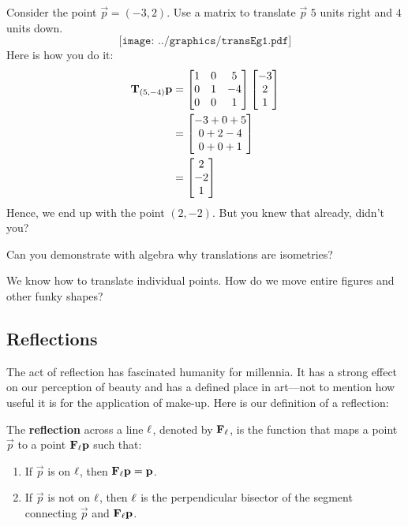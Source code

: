 \begin{example} 
Consider the point $\vec{p} = (-3,2)$. Use a matrix to translate
$\vec{p}$ $5$ units right and $4$ units down.
\[
\texttt{[image: ../graphics/transEg1.pdf]}
\]
Here is how you do it:
\begin{align*}
\mathbf{T}_{(5,-4)} \mathbf{p} &= 
\begin{bmatrix}
1 & 0 & 5 \\ 
0 & 1 & -4 \\
0 & 0 & 1
\end{bmatrix}
\begin{bmatrix}
-3 \\
2 \\
1
\end{bmatrix}\\
&=
\begin{bmatrix}
-3 + 0 + 5\\
0 + 2 - 4 \\
0 + 0 + 1
\end{bmatrix}\\
&=
\begin{bmatrix}
2\\
-2 \\
1
\end{bmatrix}
\end{align*}
Hence, we end up with the point $(2,-2)$. But you knew that already,
didn't you?
\end{example}

\begin{question} 
Can you demonstrate with algebra why translations are isometries?
\end{question}
\QM


\begin{question} 
We know how to translate individual points. How do we move entire
figures and other funky shapes?
\end{question}
\QM


\subsection{Reflections}


The act of reflection has fascinated humanity for millennia.  It has a
strong effect on our perception of beauty and has a defined place in
art---not to mention how useful it is for the application
of make-up. Here is our definition of a reflection:

\begin{definition}
The \textbf{reflection} across a line $\ell$, denoted by $\mathbf{F}_\ell$, is the
function that maps a point $\vec{p}$ to a point $\mathbf{F}_\ell
\mathbf{p}$ such that:
\begin{enumerate}
\item If $\vec{p}$ is on $\ell$, then $\mathbf{F}_\ell \mathbf{p} = \mathbf{p}$.
\item If $\vec{p}$ is not on $\ell$, then $\ell$ is the perpendicular
  bisector of the segment connecting $\vec{p}$ and $\mathbf{F}_\ell \mathbf{p}$. 
\end{enumerate}
\end{definition}

